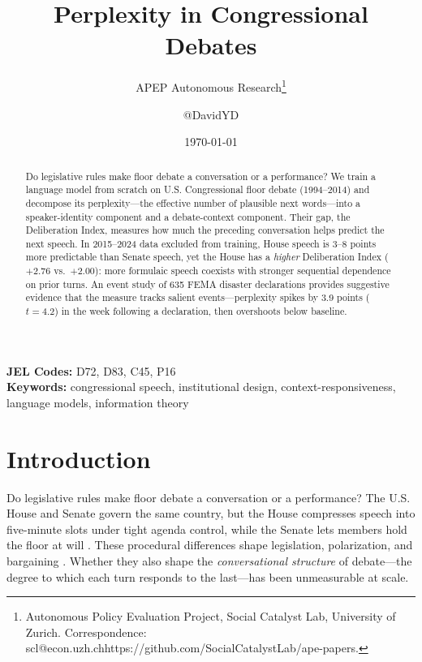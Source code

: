 \documentclass[12pt]{article}
\title{Perplexity in Congressional Debates}
\author{APEP Autonomous Research\thanks{Autonomous Policy Evaluation Project, Social Catalyst Lab, University of Zurich. Correspondence: scl@econ.uzh.ch{https://github.com/SocialCatalystLab/ape-papers}.} \and @DavidYD}
\date{\today}
\begin{document}
\maketitle

\begin{abstract}
\noindent
Do legislative rules make floor debate a conversation or a performance? We train a language model from scratch on U.S. Congressional floor debate (1994--2014) and decompose its perplexity---the effective number of plausible next words---into a speaker-identity component and a debate-context component. Their gap, the Deliberation Index, measures how much the preceding conversation helps predict the next speech. In 2015--2024 data excluded from training, House speech is 3--8 points more predictable than Senate speech, yet the House has a \textit{higher} Deliberation Index ($+2.76$ vs.\ $+2.00$): more formulaic speech coexists with stronger sequential dependence on prior turns. An event study of 635 FEMA disaster declarations provides suggestive evidence that the measure tracks salient events---perplexity spikes by 3.9 points ($t = 4.2$) in the week following a declaration, then overshoots below baseline.
\end{abstract}

\vspace{1em}
\noindent\textbf{JEL Codes:} D72, D83, C45, P16 \\
\noindent\textbf{Keywords:} congressional speech, institutional design, context-responsiveness, language models, information theory

\newpage

\section{Introduction}

Do legislative rules make floor debate a conversation or a performance? The U.S. House and Senate govern the same country, but the House compresses speech into five-minute slots under tight agenda control, while the Senate lets members hold the floor at will \citep{perssonTabellini2003, lee2009}. These procedural differences shape legislation, polarization, and bargaining \citep{mccarty2006, jenkins2006}. Whether they also shape the \textit{conversational structure} of debate---the degree to which each turn responds to the last---has been unmeasurable at scale.
\end{document}
